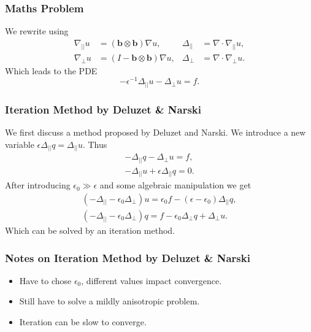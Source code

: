 \documentclass{beamer}
\begin{document}
    \begin{frame}
        \frametitle{Maths Problem}
	We rewrite using
    \begin{align*}
    \nabla_{||}u &= (\mathbf{b}\otimes \mathbf{b})\nabla u, &\Delta_{||} &= \nabla \cdot \nabla_{||}u, \\
    \nabla_{\bot}u &= (I-\mathbf{b}\otimes \mathbf{b})\nabla u, &\Delta_{\bot} &= \nabla \cdot \nabla_{\bot}u.
    \end{align*}
    Which leads to the PDE
    \begin{equation*}
    -\epsilon^{-1}\Delta_{||}u-\Delta_{\bot}u = f.
    \end{equation*}
   \end{frame}
    
    \begin{frame}
        \frametitle{Iteration Method by Deluzet \& Narski}
          We first discuss a method proposed by Deluzet and Narski. We introduce a new variable $\epsilon \Delta_{||}q = \Delta_{||}u$. Thus 
          \begin{align*}
          -\Delta_{||} q - \Delta_{\perp} u = f, \\
          -\Delta_{||} u + \epsilon \Delta_{||} q = 0.
          \end{align*}
  After introducing $\epsilon_0 \gg \epsilon$ and some algebraic manipulation we get
  \begin{align*}
  (-\Delta_{||}-\epsilon_0 \Delta_{\perp})u = \epsilon_0 f - (\epsilon-\epsilon_0)\Delta_{||}q,\\
  (-\Delta_{||}-\epsilon_0 \Delta_{\perp})q = f - \epsilon_0 \Delta_{\perp}q + \Delta_{\perp}u.
  \end{align*}
  Which can be solved by an iteration method.
  \end{frame}
    \begin{frame}
        \frametitle{Notes on Iteration Method by Deluzet \& Narski}
        \begin{itemize}
\item Have to chose $\epsilon_0$, different values impact convergence.
\item  Still have to solve a mildly anisotropic problem.
\item Iteration can be slow to converge.

        \end{itemize}
  \end{frame}
    
\end{document}
